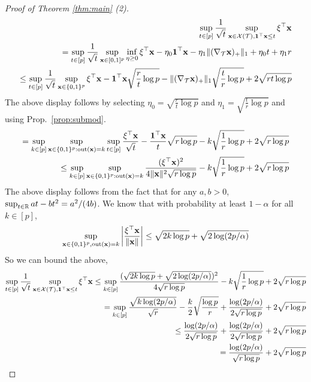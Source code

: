 \begin{proof}[Proof of Theorem \ref{thm:main} (2)]
\[
\begin{aligned}
\sup_{t \in [p]} \frac 1{\sqrt{t}} \sup_{\mathbf{x} \in \mathcal{X}({\mathcal{T}}), {\bf 1}^\top \mathbf{x} \le t}  \xi^\top \mathbf{x}\\
= \sup_{t \in [p]} \frac 1{\sqrt{t}} \sup_{\mathbf{x} \in [0,1]^p} \inf_{\eta \ge 0} \xi^\top \mathbf{x} - \eta_0 {\bf 1}^\top \mathbf{x} - \eta_1 \|(\nabla_{\mathcal{T}} \mathbf{x})_+ \|_1 + \eta_0 t + \eta_1 r\\
\le \sup_{t \in [p]} \frac 1{\sqrt{t}} \sup_{\mathbf{x} \in \{0,1\}^p} \xi^\top \mathbf{x} - {\bf 1}^\top \mathbf{x} \sqrt{\frac{r}{t} \log p} - \|(\nabla_{\mathcal{T}} \mathbf{x})_+ \|_1 \sqrt{\frac{t}{r} \log p} + 2 \sqrt{rt \log p}
\end{aligned}
\]
The above display follows by selecting $\eta_0 = \sqrt{\frac rt \log p}$ and $\eta_1 = \sqrt{\frac tr \log p}$ and using Prop.~\ref{prop:submod}.
\[
\begin{aligned}
= \sup_{k \in [p]} \sup_{\mathbf{x} \in \{0,1\}^p : \textrm{out}(\mathbf{x}) = k} \sup_{t \in [p]} \frac{\xi^\top \mathbf{x}}{\sqrt t} - \frac{{\bf 1}^\top \mathbf{x}}{t} \sqrt{r \log p} - k \sqrt{\frac{1}{r} \log p} + 2 \sqrt{r \log p}\\
\le \sup_{k \in [p]} \sup_{\mathbf{x} \in \{0,1\}^p : \textrm{out}(\mathbf{x}) = k} \frac{(\xi^\top \mathbf{x})^2}{4 \| \mathbf{x} \|^2 \sqrt{r \log p}} - k \sqrt{\frac{1}{r} \log p} + 2 \sqrt{r \log p}\\
\end{aligned}
\]
The above display follows from the fact that for any $a,b > 0$, $\sup_{t \in \mathbb{R}} a t - b t^2 = a^2 / (4b)$.
We know that with probability at least $1 - \alpha$ for all $k \in [p]$,
\[
\sup_{\mathbf{x} \in \{0,1\}^p, \textrm{out}(\mathbf{x}) = k} \left| \frac{\xi^\top \mathbf{x}}{\| \mathbf{x} \|} \right| \le \sqrt{2 k \log p} + \sqrt{2 \log (2p / \alpha)}
\]
So we can bound the above,
\[
\begin{aligned}
\sup_{t \in [p]} \frac 1{\sqrt{t}} \sup_{\mathbf{x} \in \mathcal{X}({\mathcal{T}}), {\bf 1}^\top \mathbf{x} \le t}  \xi^\top \mathbf{x} \le \sup_{k \in [p]} \frac{(\sqrt{2 k \log p} + \sqrt{2 \log (2p / \alpha)})^2}{4 \sqrt{r \log p}} - k \sqrt{\frac{1}{r} \log p} + 2 \sqrt{r \log p}\\
= \sup_{k \in [p]} \frac{\sqrt{k \log (2p / \alpha)}}{\sqrt{r}} - \frac{k}{2} \sqrt{\frac{\log p}{r}} + \frac{\log(2p / \alpha)}{2\sqrt{r \log p}} + 2 \sqrt{r \log p}\\ 
\le \frac{\log (2p / \alpha)}{2 \sqrt{r \log p} } + \frac{\log(2p / \alpha)}{2\sqrt{r \log p}} + 2 \sqrt{r \log p}\\ 
= \frac{\log (2p / \alpha)}{\sqrt{r \log p} } + 2 \sqrt{r \log p}\\ 
\end{aligned}
\]
\end{proof}
